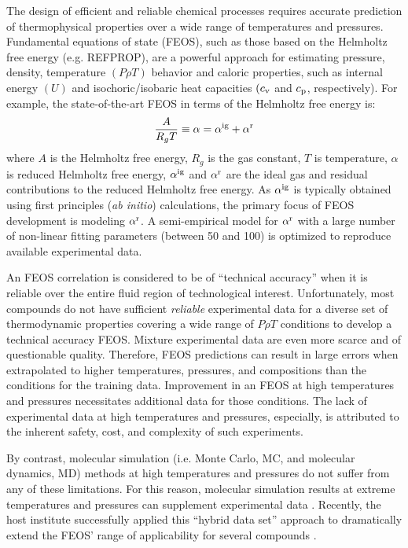 \documentclass[11pt,a4paper]{article}
\begin{document}
The design of efficient and reliable chemical processes requires accurate prediction of thermophysical properties over a wide range of temperatures and pressures. Fundamental equations of state (FEOS), such as those based on the Helmholtz free energy (e.g. REFPROP), are a powerful approach for estimating pressure, density, temperature $(P\rho T)$ behavior and caloric properties, such as internal energy $(U)$ and isochoric/isobaric heat capacities $(c_{\rm v}$ and $c_{\rm p}$, respectively). For example, the state-of-the-art FEOS in terms of the Helmholtz free energy is:
\begin{equation}
\frac{A}{R_gT} \equiv \alpha = \alpha^{\rm ig} + \alpha^{\rm r}
\end{equation} 
where $A$ is the Helmholtz free energy, $R_g$ is the gas constant, $T$ is temperature, $\alpha$ is reduced Helmholtz free energy, $\alpha^{\rm ig}$ and $\alpha^{\rm r}$ are the ideal gas and residual contributions to the reduced Helmholtz free energy. As $\alpha^{\rm ig}$ is typically obtained using first principles (\textit{ab initio}) calculations, the primary focus of FEOS development is modeling $\alpha^{\rm r}$. A semi-empirical model for $\alpha^{\rm r}$ with a large number of non-linear fitting parameters (between 50 and 100) is optimized to reproduce available experimental data. 

An FEOS correlation is considered to be of ``technical accuracy'' when it is reliable over the entire fluid region of technological interest. Unfortunately, most compounds do not have sufficient \textit{reliable} experimental data for a diverse set of thermodynamic properties covering a wide range of $P \rho T$ conditions to develop a technical accuracy FEOS. Mixture experimental data are even more scarce and of questionable quality. Therefore, FEOS predictions can result in large errors when extrapolated to higher temperatures, pressures, and compositions than the conditions for the training data. Improvement in an FEOS at high temperatures and pressures necessitates additional data for those conditions. The lack of experimental data at high temperatures and pressures, especially, is attributed to the inherent safety, cost, and complexity of such experiments.

By contrast, molecular simulation (i.e. Monte Carlo, MC, and molecular dynamics, MD) methods at high temperatures and pressures do not suffer from any of these limitations. For this reason, molecular simulation results at extreme temperatures and pressures can supplement experimental data \cite{Thol2016_LJ,Thol_LJTS,Rutkai2017,Lustig2015,Rutkai2015}. Recently, the host institute successfully applied this ``hybrid data set'' approach to dramatically extend the FEOS' range of applicability for several compounds \cite{Rutkai2013,Thol2016_siloxane_first,Thol2016_siloxane,Thol2017,Thol2015}.
\end{document}
